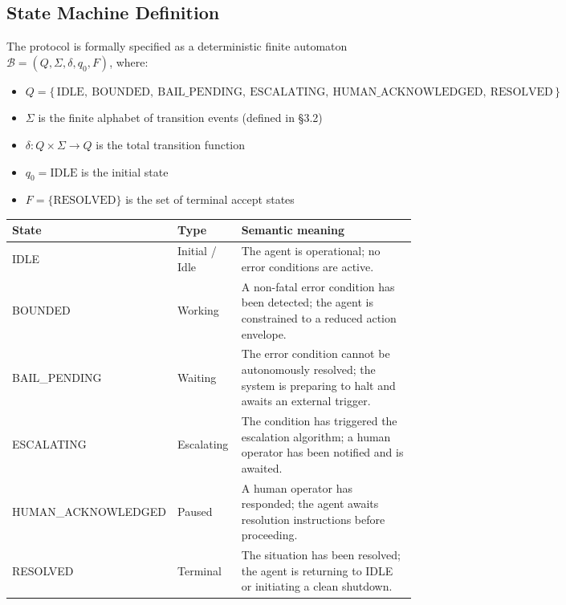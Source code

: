 \subsection{State Machine Definition}

The protocol is formally specified as a deterministic finite automaton
$\mathcal{B} = (Q, \Sigma, \delta, q_0, F)$, where:

\begin{itemize}
  \item $Q = \{\,\text{IDLE},\ \text{BOUNDED},\ \text{BAIL\_PENDING},\ \text{ESCALATING},\ \text{HUMAN\_ACKNOWLEDGED},\ \text{RESOLVED}\,\}$
  \item $\Sigma$ is the finite alphabet of transition events (defined in \S3.2)
  \item $\delta: Q \times \Sigma \rightarrow Q$ is the total transition function
  \item $q_0 = \text{IDLE}$ is the initial state
  \item $F = \{\text{RESOLVED}\}$ is the set of terminal accept states
\end{itemize}

\bigskip

\begin{center}
\begin{tabular}{|l|l|p{6.5cm}|}
\hline
\textbf{State} &
\textbf{Type} &
\textbf{Semantic meaning} \\ \hline
IDLE & Initial / Idle & The agent is operational; no error conditions are active. \\ \hline
BOUNDED & Working & A non-fatal error condition has been detected; the agent is
constrained to a reduced action envelope. \\ \hline
BAIL\_PENDING & Waiting & The error condition cannot be autonomously resolved;
the system is preparing to halt and awaits an external trigger. \\ \hline
ESCALATING & Escalating & The condition has triggered the escalation algorithm;
a human operator has been notified and is awaited. \\ \hline
HUMAN\_ACKNOWLEDGED & Paused & A human operator has responded; the agent awaits
resolution instructions before proceeding. \\ \hline
RESOLVED & Terminal & The situation has been resolved; the agent is returning to
IDLE or initiating a clean shutdown. \\ \hline
\end{tabular}
\end{center}

